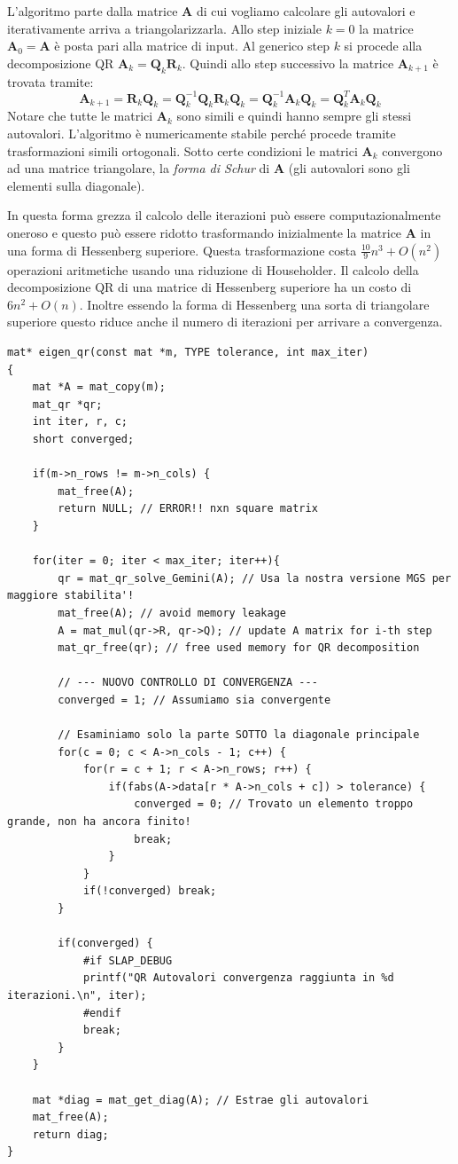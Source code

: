 \documentclass[10pt]{article}
\begin{document}
L'algoritmo parte dalla matrice $\mathbf{A}$ di cui vogliamo calcolare gli autovalori e iterativamente arriva a triangolarizzarla. Allo step iniziale $k=0$ la matrice $\mathbf{A}_0=\mathbf{A}$ è posta pari alla matrice di input. Al generico step $k$ si procede alla decomposizione QR $\mathbf{A}_k=\mathbf{Q}_k\mathbf{R}_k$. Quindi allo step successivo la matrice $\mathbf{A}_{k+1}$ è trovata tramite:
\begin{equation}
\mathbf{A}_{k+1} = \mathbf{R}_k\mathbf{Q}_k = \mathbf{Q}_k^{-1}\mathbf{Q}_k\mathbf{R}_k\mathbf{Q}_k = 
\mathbf{Q}_k^{-1}\mathbf{A}_k\mathbf{Q}_k = \mathbf{Q}_k^T\mathbf{A}_k\mathbf{Q}_k
\end{equation}
Notare che tutte le matrici $\mathbf{A}_k$ sono simili e quindi hanno sempre gli stessi autovalori. L'algoritmo è numericamente stabile perché procede tramite trasformazioni simili ortogonali.
Sotto certe condizioni le matrici $\mathbf{A}_k$ convergono ad una matrice triangolare, la \emph{forma di Schur} di $\mathbf{A}$ (gli autovalori sono gli elementi sulla diagonale).

In questa forma grezza il calcolo delle iterazioni può essere computazionalmente oneroso e questo può essere ridotto trasformando inizialmente la matrice $\mathbf{A}$ in una forma di Hessenberg superiore. Questa trasformazione costa $\frac{10}{9}n^3+O(n^2)$ operazioni aritmetiche usando una riduzione di Householder. Il calcolo della decomposizione QR di una matrice di Hessenberg superiore ha un costo di $6n^2+O(n)$. Inoltre essendo la forma di Hessenberg una sorta di triangolare superiore questo riduce anche il numero di iterazioni per arrivare a convergenza.

\begin{lstlisting}
mat* eigen_qr(const mat *m, TYPE tolerance, int max_iter)
{
	mat *A = mat_copy(m);
	mat_qr *qr;
	int iter, r, c;
	short converged;

	if(m->n_rows != m->n_cols) {
        mat_free(A);
        return NULL; // ERROR!! nxn square matrix
    }

	for(iter = 0; iter < max_iter; iter++){ 
		qr = mat_qr_solve_Gemini(A); // Usa la nostra versione MGS per maggiore stabilita'!
		mat_free(A); // avoid memory leakage
		A = mat_mul(qr->R, qr->Q); // update A matrix for i-th step
		mat_qr_free(qr); // free used memory for QR decomposition

		// --- NUOVO CONTROLLO DI CONVERGENZA ---
		converged = 1; // Assumiamo sia convergente
		
		// Esaminiamo solo la parte SOTTO la diagonale principale
		for(c = 0; c < A->n_cols - 1; c++) {
			for(r = c + 1; r < A->n_rows; r++) {
				if(fabs(A->data[r * A->n_cols + c]) > tolerance) {
					converged = 0; // Trovato un elemento troppo grande, non ha ancora finito!
					break; 
				}
			}
			if(!converged) break;
		}

		if(converged) {
			#if SLAP_DEBUG
			printf("QR Autovalori convergenza raggiunta in %d iterazioni.\n", iter);
			#endif
			break; 
		}
	}
	
	mat *diag = mat_get_diag(A); // Estrae gli autovalori
	mat_free(A);
	return diag;
}
\end{lstlisting}
\end{document}
